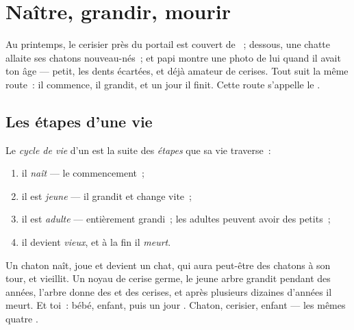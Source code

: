 \chapter{Naître, grandir, mourir}\label{ch:g2:born-grow-die}

Au printemps, le cerisier près du portail est couvert de ~;
dessous, une chatte allaite ses chatons nouveau-nés~; et papi montre
une photo de lui quand il avait ton âge --- petit, les dents
écartées, et déjà amateur de cerises. Tout  suit la même
route~: il commence, il grandit, et un jour il finit. Cette route
s'appelle le .

\section{Les étapes d'une vie}

\begin{definition}\label{def:g2:born-grow-die:cycle}
Le \emph{cycle de vie} d'un  est la
suite des \emph{étapes} que sa vie traverse~:
\begin{enumerate}
  \item il \emph{naît} --- le commencement~;
  \item il est \emph{jeune} --- il grandit et change
        vite~;
  \item il est \emph{adulte} --- entièrement
        grandi~; les adultes peuvent avoir des petits~;
  \item il devient \emph{vieux}, et à la fin il
        \emph{meurt}.
\end{enumerate}
\end{definition}

\begin{example}\label{ex:g2:born-grow-die:three}
Un chaton naît, joue et devient un chat, qui aura peut-être des
chatons à son tour, et vieillit. Un noyau de cerise germe, le jeune
arbre grandit pendant des années, l'arbre  donne des  et
des cerises, et après plusieurs dizaines d'années il meurt. Et toi~:
bébé, enfant, puis un jour . Chaton, cerisier, enfant --- les
mêmes quatre .
\end{example}

